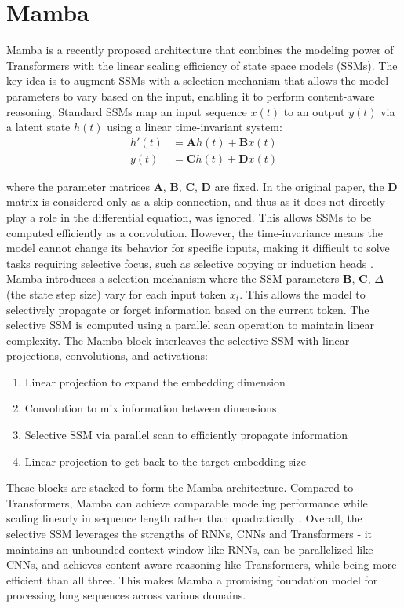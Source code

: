 \documentclass[conference]{IEEEtran}
\begin{document}
\section{Mamba}
Mamba \cite{gu2023mamba} is a recently proposed architecture that combines the modeling power of Transformers with the linear scaling efficiency of state space models (SSMs). The key idea is to augment SSMs with a selection mechanism that allows the model parameters to vary based on the input, enabling it to perform content-aware reasoning.
Standard SSMs map an input sequence $x(t)$ to an output $y(t)$ via a latent state $h(t)$ using a linear time-invariant system:
\begin{align*}
    h'(t) & = \mathbf{A}h(t) + \mathbf{B}x(t) \\
    y(t)  & = \mathbf{C}h(t) + \mathbf{D}x(t)
\end{align*}

where the parameter matrices $\mathbf{A}$, $\mathbf{B}$, $\mathbf{C}$, $\mathbf{D}$ are fixed. In the original paper, the $\mathbf{D}$ matrix is considered only as a skip connection, and thus as it does not directly play a role in the differential equation, was ignored. This allows SSMs to be computed efficiently as a convolution. However, the time-invariance means the model cannot change its behavior for specific inputs, making it difficult to solve tasks requiring selective focus, such as selective copying or induction heads \cite{gu2023mamba}.
Mamba introduces a selection mechanism where the SSM parameters $\mathbf{B}$, $\mathbf{C}$, $\Delta$ (the state step size) vary for each input token $x_t$. This allows the model to selectively propagate or forget information based on the current token. The selective SSM is computed using a parallel scan operation to maintain linear complexity.
The Mamba block interleaves the selective SSM with linear projections, convolutions, and activations:
\begin{enumerate}
    \item Linear projection to expand the embedding dimension
    \item Convolution to mix information between dimensions
    \item Selective SSM via parallel scan to efficiently propagate information
    \item Linear projection to get back to the target embedding size
\end{enumerate}
These blocks are stacked to form the Mamba architecture. Compared to Transformers, Mamba can achieve comparable modeling performance while scaling linearly in sequence length rather than quadratically \cite{gu2023mamba}. Overall, the selective SSM leverages the strengths of RNNs, CNNs and Transformers - it maintains an unbounded context window like RNNs, can be parallelized like CNNs, and achieves content-aware reasoning like Transformers, while being more efficient than all three. This makes Mamba a promising foundation model for processing long sequences across various domains.
\end{document}
